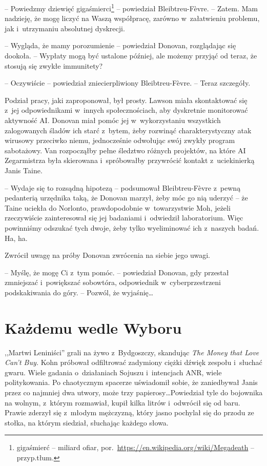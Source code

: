 \documentclass[oneside,polish,11pt,sfheadings]{mwbk}
\begin{document}
-- Powiedzmy dziewięć gigaśmierci\footnote{
gigaśmierć -- miliard ofiar,
por.~\url{https://en.wikipedia.org/wiki/Megadeath} -- przyp.tłum.} -- powiedział Bleibtreu-Fèvre.  -- Zatem. Mam nadzieję, że mogę liczyć na Waszą współpracę,
zarówno w~załatwieniu problemu, jak i~utrzymaniu absolutnej dyskrecji.

-- Wygląda, że mamy porozumienie -- powiedział Donovan, rozglądając się
dookoła. -- Wypłaty mogą być ustalone później, ale możemy przyjąć od
teraz, że stosują się zwykłe immunitety?

-- Oczywiście -- powiedział zniecierpliwiony Bleibtreu-Fèvre. -- Teraz
szczegóły.

Podział pracy, jaki zaproponował, był prosty. Lawson miała skontaktować
się z~jej odpowiednikami w~innych społecznościach, aby dyskretnie
monitorować aktywność AI. Donovan miał pomóc jej w~wykorzystaniu
wszystkich zalogowanych śladów ich starć z~bytem, żeby rozwinąć
charakterystyczny atak wirusowy przeciwko niemu, jednocześnie odwołując
swój zwykły program sabotażowy. Van rozpocząłby pełne śledztwo różnych
projektów, na które AI Zegarmistrza była skierowana i~spróbowałby
przywrócić kontakt z~uciekinierką Janis Taine.

-- Wydaje się to rozsądną hipotezą -- podsumował Bleibtreu-Fèvre z~pewną
pedanterią urzędnika taką, że Donovan marzył, żeby móc go nią uderzyć -- że Taine uciekła do Norlonto, prawdopodobnie w~towarzystwie Moh, jeżeli
rzeczywiście zainteresował się jej badaniami i~odwiedził laboratorium.
Więc powinniśmy odszukać tych dwoje, żeby tylko wyeliminować ich z~naszych badań. Ha, ha.

Zwrócił uwagę na próby Donovan zwrócenia na siebie jego uwagi.

-- Myślę, że mogę Ci z~tym pomóc. -- powiedział Donovan, gdy przestał
zmniejszać i~powiększać sobowtóra, odpowiednik w~cyberprzestrzeni
podskakiwania do góry. -- Pozwól, że wyjaśnię\ldots

\chapter{Każdemu wedle Wyboru}

,,Martwi Leniniści'' grali na żywo z~Bydgoszczy, skandując \emph{The
Money that Love Can't Buy.} Kohn próbował odfiltrować zadymiony ciężki
dźwięk zespołu i~słuchać gwaru. Wiele gadania o~działaniach Sojuszu i~intencjach ANR, wiele politykowania. Po chaotycznym spacerze uświadomił
sobie, że zaniedbywał Janis przez co najmniej dwa utwory, może trzy
papierosy\ldots Powiedział tyle do bojownika na wolnym, z~którym rozmawiał,
kupił kilka litrów i~odwrócił się od baru. Prawie zderzył się z~młodym
mężczyzną, który jasno pochylał się do przodu ze stołka, na którym
siedział, słuchając każdego słowa.
\end{document}
